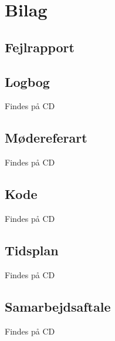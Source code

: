 \chapter{Bilag}
\section{Fejlrapport}



\section{Logbog}
Findes på CD

\section{Mødereferart}
Findes på CD

\section{Kode}
Findes på CD

\section{Tidsplan}
Findes på CD

\section{Samarbejdsaftale}
Findes på CD